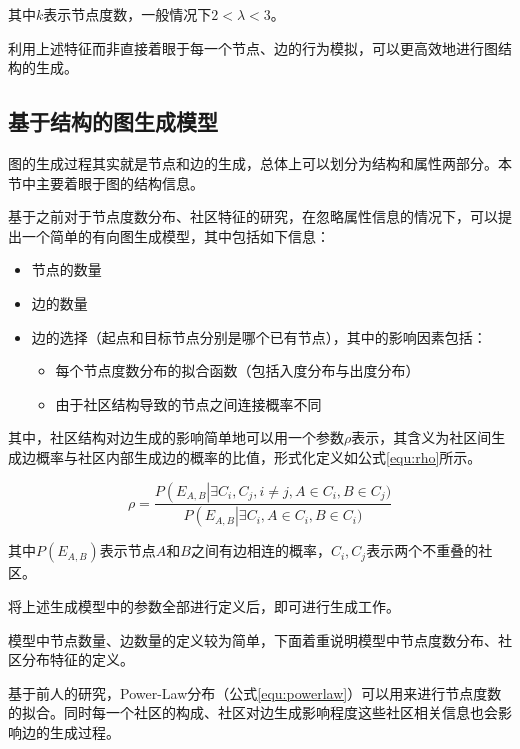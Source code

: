 \noindent 其中$k$表示节点度数，一般情况下$2<\lambda<3$。

利用上述特征而非直接着眼于每一个节点、边的行为模拟，可以更高效地进行图结构的生成。

\subsection{基于结构的图生成模型}
\label{cap:simplegen}

图的生成过程其实就是节点和边的生成，总体上可以划分为结构和属性两部分。本节中主要着眼于图的结构信息。

基于之前对于节点度数分布、社区特征的研究，在忽略属性信息的情况下，可以提出一个简单的有向图生成模型，其中包括如下信息\cite{FastSGG}：

\begin{itemize}
    \item 节点的数量
    \item 边的数量
    \item 边的选择（起点和目标节点分别是哪个已有节点），其中的影响因素包括：
    \begin{itemize}
        \item 每个节点度数分布的拟合函数（包括入度分布与出度分布）
        \item 由于社区结构导致的节点之间连接概率不同
    \end{itemize}
\end{itemize}

\vspace{0.2cm}

其中，社区结构对边生成的影响简单地可以用一个参数$\rho$表示，其含义为社区间生成边概率与社区内部生成边的概率的比值，形式化定义如公式\ref{equ:rho}所示。

\vspace{-8mm}

\begin{equation}[H]
    \label{equ:rho}
    \rho = \frac{P\left(E_{A,B}\right|\exists C_i, C_j, i\ne j, A\in C_i, B\in C_j)}{P\left(E_{A,B}\right|\exists C_i, A\in C_i, B\in C_i)}
\end{equation}

\noindent 其中$P\left(E_{A,B}\right)$表示节点$A$和$B$之间有边相连的概率，$C_i, C_j$表示两个不重叠的社区。

将上述生成模型中的参数全部进行定义后，即可进行生成工作。

模型中节点数量、边数量的定义较为简单，下面着重说明模型中节点度数分布、社区分布特征的定义。

基于前人的研究，Power-Law分布（公式\ref{equ:powerlaw}）可以用来进行节点度数的拟合。同时每一个社区的构成、社区对边生成影响程度这些社区相关信息也会影响边的生成过程。

